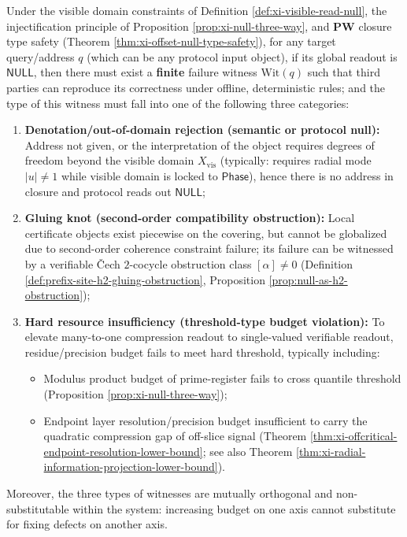 \begin{theorem}\label{thm:xi-null-complete-trichotomy-offline}
Under the visible domain constraints of Definition \ref{def:xi-visible-read-null}, the injectification principle of Proposition \ref{prop:xi-null-three-way}, and \(\mathbf{PW}\) closure type safety (Theorem \ref{thm:xi-offset-null-type-safety}),
for any target query/address \(q\) (which can be any protocol input object), if its global readout is \(\mathsf{NULL}\), then there must exist a \textbf{finite} failure witness \(\mathrm{Wit}(q)\) such that third parties can reproduce its correctness under offline, deterministic rules; and the type of this witness must fall into one of the following three categories:
\begin{enumerate}
  \item \textbf{Denotation/out-of-domain rejection (semantic or protocol null):} Address not given, or the interpretation of the object requires degrees of freedom beyond the visible domain \(X_{\mathrm{vis}}\) (typically: requires radial mode \(|u|\neq 1\) while visible domain is locked to \(\mathsf{Phase}\)), hence there is no address in closure and protocol reads out \(\mathsf{NULL}\);
  \item \textbf{Gluing knot (second-order compatibility obstruction):} Local certificate objects exist piecewise on the covering, but cannot be globalized due to second-order coherence constraint failure; its failure can be witnessed by a verifiable Čech \(2\)-cocycle obstruction class \([\alpha]\neq 0\) (Definition \ref{def:prefix-site-h2-gluing-obstruction}, Proposition \ref{prop:null-as-h2-obstruction});
  \item \textbf{Hard resource insufficiency (threshold-type budget violation):} To elevate many-to-one compression readout to single-valued verifiable readout, residue/precision budget fails to meet hard threshold, typically including:
  \begin{itemize}
    \item Modulus product budget of prime-register fails to cross quantile threshold (Proposition \ref{prop:xi-null-three-way});
    \item Endpoint layer resolution/precision budget insufficient to carry the quadratic compression gap of off-slice signal (Theorem \ref{thm:xi-offcritical-endpoint-resolution-lower-bound}; see also Theorem \ref{thm:xi-radial-information-projection-lower-bound}).
  \end{itemize}
\end{enumerate}
Moreover, the three types of witnesses are mutually orthogonal and non-substitutable within the system: increasing budget on one axis cannot substitute for fixing defects on another axis.
\end{theorem}

